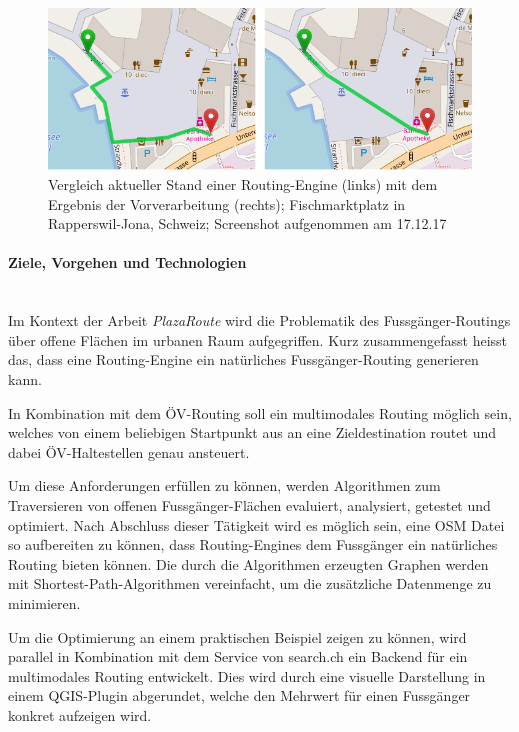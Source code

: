 \begin{figure}[ht]
    \centering
    \includegraphics[width=1\linewidth]{technicalreport/img/compare_fischmarktplatz.png}
    \caption[Vergleich Ausgangslage und Ergebnis]{Vergleich aktueller Stand einer Routing-Engine (links) mit dem Ergebnis der Vorverarbeitung (rechts); Fischmarktplatz in Rapperswil-Jona, Schweiz; Screenshot aufgenommen am 17.12.17}
    \label{fig:compare_fischmarktplatz}
\end{figure}


\paragraph{Ziele, Vorgehen und Technologien}~\\
Im Kontext der Arbeit \emph{PlazaRoute} wird die Problematik des Fussgänger-Routings über offene Flächen im urbanen Raum aufgegriffen. Kurz zusammengefasst heisst das, dass eine \gls{Routing-Engine} ein natürliches Fussgänger-Routing generieren kann.

In Kombination mit dem ÖV-Routing soll ein multimodales Routing möglich sein, welches von einem beliebigen Startpunkt aus an eine Zieldestination routet und dabei ÖV-Haltestellen genau ansteuert.

Um diese Anforderungen erfüllen zu können, werden Algorithmen zum Traversieren von offenen Fussgänger-Flächen evaluiert, analysiert, getestet und optimiert. Nach Abschluss dieser Tätigkeit wird es möglich sein, eine \ac{OSM} Datei so aufbereiten zu können, dass \glspl{Routing-Engine} dem Fussgänger ein natürliches Routing bieten können. Die durch die Algorithmen erzeugten Graphen werden mit \gls{Shortest-Path}-Algorithmen vereinfacht, um die zusätzliche Datenmenge zu minimieren.

Um die Optimierung an einem praktischen Beispiel zeigen zu können, wird parallel in Kombination mit dem Service von search.ch ein Backend für ein multimodales Routing entwickelt. Dies wird durch eine visuelle Darstellung in einem \gls{QGIS}-Plugin abgerundet, welche den Mehrwert für einen Fussgänger konkret aufzeigen wird.

